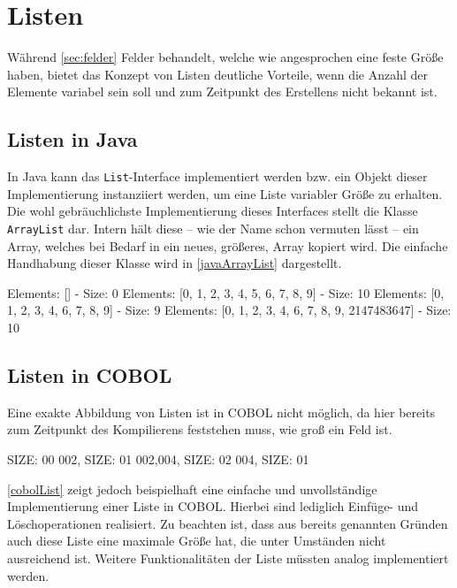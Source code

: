 \section{Listen}\label{lists}
Während \autoref{sec:felder} Felder behandelt, welche wie angesprochen eine feste Größe haben, bietet das Konzept von Listen deutliche Vorteile, wenn die Anzahl der Elemente variabel sein soll und zum Zeitpunkt des Erstellens nicht bekannt ist.

\subsection*{Listen in Java}
In Java kann das \texttt{List}-Interface implementiert werden bzw. ein Objekt dieser Implementierung instanziiert werden, um eine Liste variabler Größe zu erhalten. Die wohl gebräuchlichste Implementierung dieses Interfaces stellt die Klasse \texttt{ArrayList} dar. Intern hält diese -- wie der Name schon vermuten lässt -- ein Array, welches bei Bedarf in ein neues, größeres, Array kopiert wird. Die einfache Handhabung dieser Klasse wird in  \autoref{javaArrayList} dargestellt.

\begin{shellwindow}
Elements: [] - Size: 0
Elements: [0, 1, 2, 3, 4, 5, 6, 7, 8, 9] - Size: 10
Elements: [0, 1, 2, 3, 4, 6, 7, 8, 9] - Size: 9
Elements: [0, 1, 2, 3, 4, 6, 7, 8, 9, 2147483647] - Size: 10
\end{shellwindow}

\subsection*{Listen in COBOL}
Eine exakte Abbildung von Listen ist in COBOL nicht möglich, da hier bereits zum Zeitpunkt des Kompilierens feststehen muss, wie groß ein Feld ist.

\begin{shellwindow}
 SIZE: 00
002, SIZE: 01
002,004, SIZE: 02
004, SIZE: 01
\end{shellwindow}

\autoref{cobolList} zeigt jedoch beispielhaft eine einfache und unvollständige Implementierung einer Liste in COBOL. Hierbei sind lediglich Einfüge- und Löschoperationen realisiert. Zu beachten ist, dass aus bereits genannten Gründen auch diese Liste eine maximale Größe hat, die unter Umständen nicht ausreichend ist. Weitere Funktionalitäten der Liste müssten analog implementiert werden.